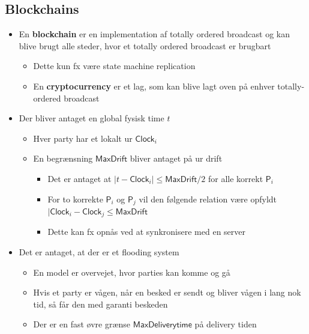 \documentclass[a4, english]{article}
\begin{document}
\subsection{Blockchains}
\begin{itemize}
	\item En \textbf{blockchain} er en implementation af totally ordered broadcast og kan blive brugt alle steder, hvor et totally ordered broadcast er brugbart
  \begin{itemize}
  	\item Dette kun fx være state machine replication
    \item En \textbf{cryptocurrency} er et lag, som kan blive lagt oven på enhver totally-ordered broadcast 
  \end{itemize}
  \item Der bliver antaget en global fysisk time $t$ 
  \begin{itemize}
  	\item Hver party har et lokalt ur $\mathsf{Clock}_i$ 
    \item En begrænsning $\mathsf{MaxDrift}$ bliver antaget på ur drift
    \begin{itemize}
    	\item Det er antaget at $|t-\mathsf{Clock}_i| \leq \mathsf{MaxDrift}/2$ for alle korrekt $\mathsf{P}_i$ 
      \item For to korrekte $\mathsf{P}_i$ og $\mathsf{P}_j$ vil den følgende relation være opfyldt $|\mathsf{Clock}_i - \mathsf{Clock}_j \leq \mathsf{MaxDrift}$ 
      \item Dette kan fx opnås ved at synkronisere med en server
    \end{itemize}
  \end{itemize}
  \item Det er antaget, at der er et flooding system 
  \begin{itemize}
  	\item En model er overvejet, hvor parties kan komme og gå
    \item Hvis et party er vågen, når en besked er sendt og bliver vågen i lang nok tid, så får den med garanti beskeden 
    \item Der er en fast øvre grænse $\mathsf{MaxDeliverytime}$ på delivery tiden
  \end{itemize}
  
\end{itemize}
\end{document}
